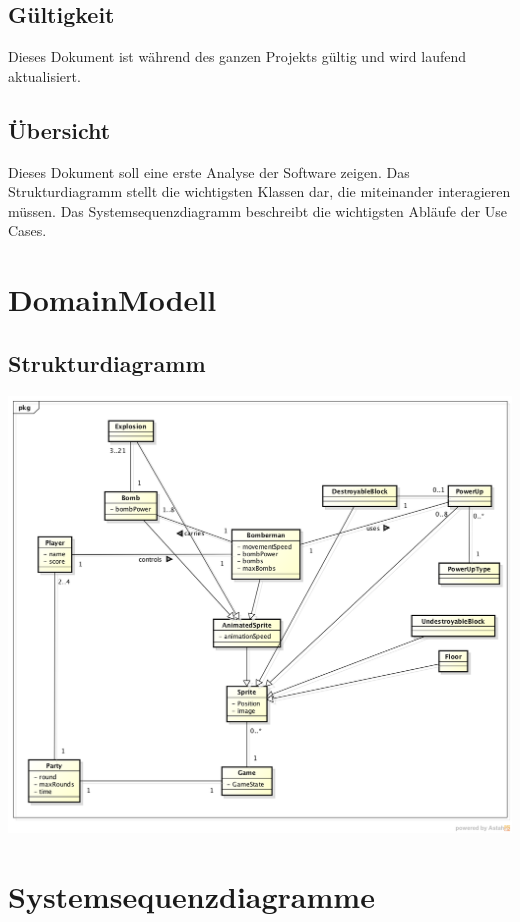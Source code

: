 \documentclass[11pt]{scrartcl}
\begin{document}
\subsection{Gültigkeit}
\label{sec:Gültigkeit}
Dieses Dokument ist während des ganzen Projekts gültig und wird laufend aktualisiert.

\subsection{Übersicht}
\label{sec:Übersicht}
Dieses Dokument soll eine erste Analyse der Software zeigen. 
Das Strukturdiagramm stellt die wichtigsten Klassen dar,
 die miteinander interagieren müssen. Das Systemsequenzdiagramm 
 beschreibt die wichtigsten Abläufe der Use Cases.

\newpage
\section{DomainModell}
\label{sec:DomainModell}
\subsection{Strukturdiagramm}
\label{sec:Strukturdiagramm}

\begin{center}
\includegraphics[scale=0.5]{Strukturdiagramm_JBomberman} 
\end{center}

\newpage
\section{Systemsequenzdiagramme}
\label{sec:Systemsequenzdiagramme}
\end{document}
